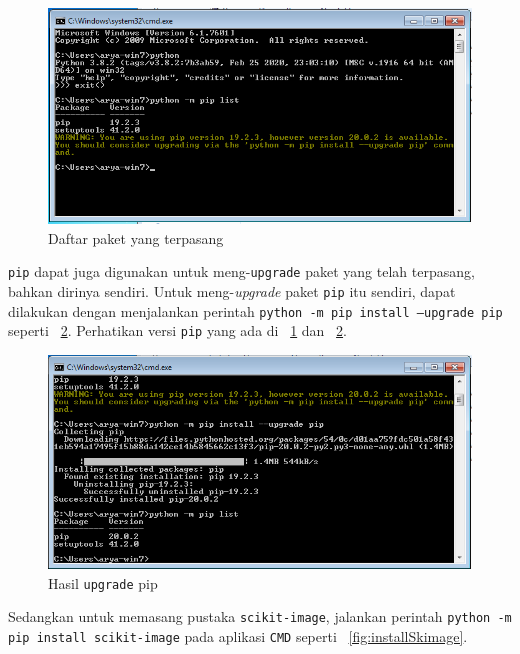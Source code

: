 \begin{figure}[h!]
  \begin{center}
    \includegraphics[scale=.5]{pics/pipList.png}
    \caption{Daftar paket yang terpasang}
    \label{fig:daftarPaket}
  \end{center}
\end{figure}

\texttt{pip} dapat juga digunakan untuk meng-\texttt{upgrade} paket yang telah terpasang, bahkan dirinya sendiri. Untuk meng-\textit{upgrade} paket \texttt{pip} itu sendiri, dapat dilakukan dengan menjalankan perintah \texttt{python -m pip install --upgrade pip} seperti \figurename~\ref{fig:pipUpgrade}. Perhatikan versi \texttt{pip} yang ada di \figurename~\ref{fig:daftarPaket} dan \figurename~\ref{fig:pipUpgrade}.
 
\begin{figure}
  \begin{center}
    \includegraphics[scale=.5]{pics/pipList2.png}
    \caption{Hasil \texttt{upgrade} pip}
    \label{fig:pipUpgrade}
  \end{center}
\end{figure}

Sedangkan untuk memasang pustaka \texttt{scikit-image}, jalankan perintah \texttt{python -m pip install scikit-image} pada aplikasi \texttt{CMD} seperti \figurename~\ref{fig:installSkimage}.

